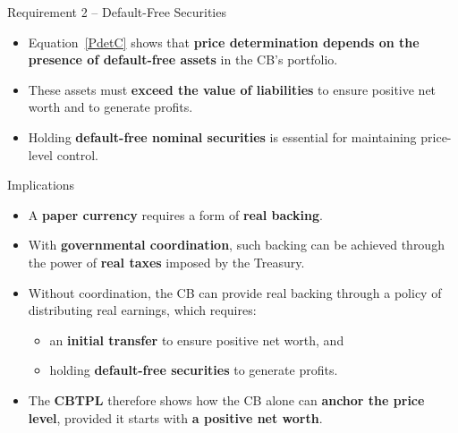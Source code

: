 \documentclass[11pt,aspectratio=169]{beamer}
\begin{document}
\begin{frame}{Requirement 2 – Default-Free Securities}


\begin{itemize}
  \item Equation~\eqref{PdetC} shows that \textbf{price determination depends on the presence of default-free assets} in the CB’s portfolio.

  \vspace{0.25cm}
  \item These assets must \textbf{exceed the value of liabilities} to ensure positive net worth and to generate profits.

  \vspace{0.25cm}
  \item Holding \textbf{default-free nominal securities} is essential for maintaining price-level control.
\end{itemize}

\end{frame}

\begin{frame}{Implications}


\begin{itemize}
  \item A \textbf{paper currency} requires a form of \textbf{real backing}.
  
  \vspace{0.2cm}
  \item With \textbf{governmental coordination}, such backing can be achieved through the power of \textbf{real taxes} imposed by the Treasury.
  
  \vspace{0.2cm}
  \item Without coordination, the CB can provide real backing through a policy of distributing real earnings, which requires:
  \begin{itemize}
    \item an \textbf{initial transfer} to ensure positive net worth, and  
    \item holding \textbf{default-free securities} to generate profits.  
  \end{itemize}
  
  \vspace{0.2cm}
  \item The \textbf{CBTPL} therefore shows how the CB alone can \textbf{anchor the price level}, provided it starts with \textbf{a positive net worth}.
\end{itemize}

\end{frame}
\end{document}
